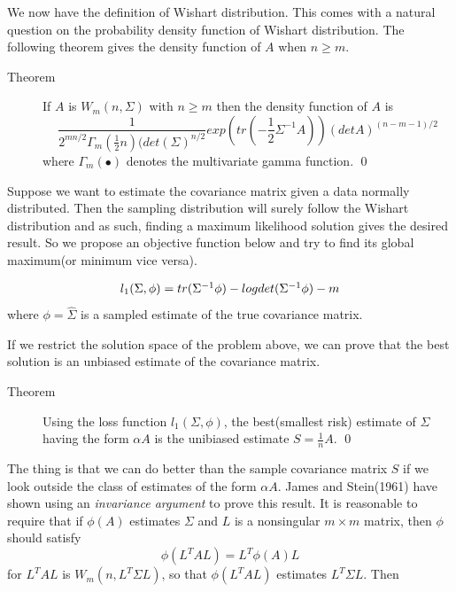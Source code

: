 \documentclass[openany]{memoir}
\begin{document}
We now have the definition of Wishart distribution. This comes with a natural question on the probability density function of Wishart distribution. The following theorem gives the density function of $A$ when $n \geq m$.

\begin{description}
\item[Theorem] If $A$ is $W_m(n, \Sigma)$ with $n \geq m$ then the density function of $A$ is
$$\frac{1}{2^{mn / 2} \Gamma_m(\frac{1}{2}n)(det(\Sigma)^{n/2}} exp(tr(-\frac{1}{2}\Sigma^{-1}A))(detA)^{(n - m - 1) / 2}$$
where $\Gamma_m(\bullet)$ denotes the multivariate gamma function. \qed
\end{description}

Suppose we want to estimate the covariance matrix given a data normally distributed. Then the sampling distribution will surely follow the Wishart distribution and as such, finding a maximum likelihood solution gives the desired result. So we propose an objective function below and try to find its global maximum(or minimum vice versa).

\begin{equation}
\begin{gathered}
$$l_1(\Sigma, \phi) = tr(\Sigma^{-1}\phi) - logdet(\Sigma^{-1} \phi) - m$$
\end{gathered}
\end{equation}
where $\phi = \hat{\Sigma}$ is a sampled estimate of the true covariance matrix.

If we restrict the solution space of the problem above, we can prove that the best solution is an unbiased estimate of the covariance matrix.

\begin{description}
\item[Theorem] Using the loss function $l_1(\Sigma, \phi)$, the best(smallest risk) estimate of $\Sigma$ having the form $\alpha A$ is the unibiased estimate $S = \frac{1}{n}A$. \qed
\end{description}

 The thing is that we can do better than the sample covariance matrix $S$ if we look outside the class of estimates of the form $\alpha A$. James and Stein(1961) have shown using an \textit{invariance argument} to prove this result. It is reasonable to require that if $\phi(A)$ estimates $\Sigma$ and $L$ is a nonsingular $m \times m$ matrix, then $\phi$ should satisfy
 $$\phi(L^TAL) = L^T\phi(A)L$$
 for $L^TAL$ is $W_m(n, L^T\Sigma L)$, so that $\phi(L^TAL)$ estimates $L^T\Sigma L$. Then 
 
\end{document}
